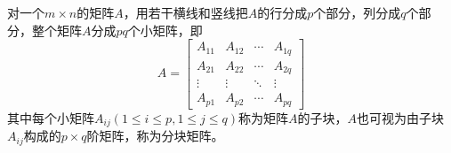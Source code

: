 \begin{Def}
对一个$m\times n$的矩阵$A$，用若干横线和竖线把$A$的行分成$p$个部分，列分成$q$个部分，整个矩阵$A$分成$pq$个小矩阵，即
$$A = \begin{bmatrix}
A_{11} & A_{12} & \cdots & A_{1q} \\
A_{21} & A_{22} & \cdots & A_{2q} \\
\vdots & \vdots & \ddots & \vdots \\
A_{p1} & A_{p2} & \cdots & A_{pq}
\end{bmatrix}$$
其中每个小矩阵$A_{ij}(1 \leqslant i \leqslant p, 1 \leqslant j \leqslant q)$称为矩阵$A$的子块，$A$也可视为由子块$A_{ij}$构成的$p\times q$阶矩阵，称为分块矩阵。
\end{Def}


